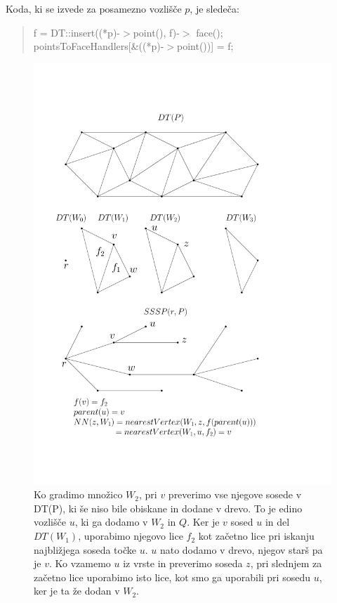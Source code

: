 \documentclass[a4paper, 12pt]{book}
\begin{document}
Koda, ki se izvede za posamezno vozlišče $p$, je sledeča:

\begin{quote}
f = DT::insert((*p)-$>$point(), f)-$>$ face();\\
pointsToFaceHandlers[\&((*p)-$>$point())] = f;
\end{quote}


\begin{figure}
\centerline{\includegraphics[scale=0.6]{pics/pointsToFaceHandlers-all.pdf}}
\caption{Ko gradimo množico $W_2$, pri $v$ preverimo vse njegove sosede v DT(P), ki še niso bile obiskane in dodane v drevo. To je edino vozlišče $u$, ki ga dodamo v $W_2$ in $Q$. Ker je $v$ sosed $u$ in del $DT(W_1)$, uporabimo njegovo lice $f_2$ kot začetno lice pri iskanju najbližjega soseda točke $u$. $u$ nato dodamo v drevo, njegov starš pa je $v$. Ko vzamemo $u$ iz vrste in preverimo soseda $z$, pri slednjem za začetno lice uporabimo isto lice, kot smo ga uporabili pri sosedu $u$, ker je ta že dodan v $W_2$.}
\label{pointsToFace}
\end{figure}
\end{document}
